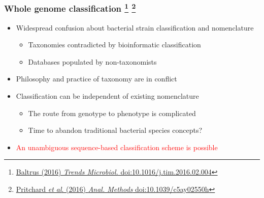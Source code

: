 \begin{frame}
  \frametitle{Whole genome classification
  \footnote{\tiny{\href{http://dx.doi.org/10.1016/j.tim.2016.02.004}{Baltrus (2016) \textit{Trends Microbiol.} doi:10.1016/j.tim.2016.02.004}}}
    \footnote{\tiny{\href{http://dx.doi.org/10.1039/c5ay02550h}{Pritchard \textit{et al}. (2016) \textit{Anal. Methods} doi:10.1039/c5ay02550h}}}
  }
      \begin{itemize}  
        \item \textcolor{hutton_green}{Widespread confusion about bacterial strain classification and nomenclature}
          \begin{itemize}
            \item Taxonomies contradicted by bioinformatic classification
            \item Databases populated by non-taxonomists
          \end{itemize}
        \item \textcolor{hutton_blue}{Philosophy and practice of taxonomy are in conflict}
        \item \textcolor{hutton_purple}{Classification can be independent of existing nomenclature}
          \begin{itemize}
            \item The route from genotype to phenotype is complicated
            \item Time to abandon traditional bacterial species concepts?
          \end{itemize}
          \item \textcolor{red}{An unambiguous sequence-based classification scheme is possible}
        \end{itemize}  
\end{frame}


